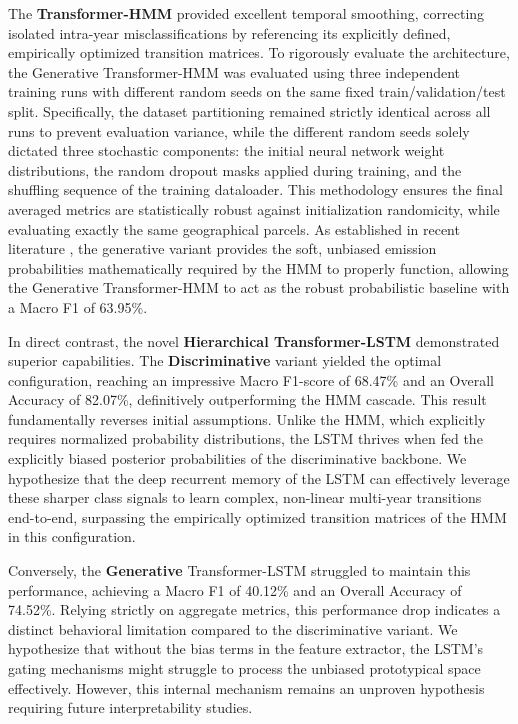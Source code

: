 The \textbf{Transformer-HMM} provided excellent temporal smoothing,
correcting isolated intra-year misclassifications by referencing its explicitly defined, empirically optimized transition matrices. 
To rigorously evaluate the architecture, the Generative Transformer-HMM was evaluated
using three independent training runs with different random seeds on the same fixed train/validation/test split. 
Specifically, the dataset partitioning remained strictly identical across all runs to prevent evaluation variance,
while the different random seeds solely dictated three stochastic components: the initial neural network weight distributions,
the random dropout masks applied during training, and the shuffling sequence of the training dataloader.
This methodology ensures the final averaged metrics are statistically robust against initialization
randomicity, while evaluating exactly the same geographical parcels.
As established in recent literature \cite{perantoni_bayesian_2024}, the generative variant provides the soft,
unbiased emission probabilities mathematically required by the HMM to properly function,
allowing the Generative Transformer-HMM to act as the robust probabilistic baseline with a Macro F1 of 63.95\%.

In direct contrast, the novel \textbf{Hierarchical Transformer-LSTM} demonstrated superior capabilities.
The \textbf{Discriminative} variant yielded the optimal configuration, reaching an impressive Macro F1-score
of 68.47\% and an Overall Accuracy of 82.07\%, definitively outperforming the HMM cascade. 
This result fundamentally reverses initial assumptions.
Unlike the HMM, which explicitly requires normalized probability distributions,
the LSTM thrives when fed the explicitly biased posterior probabilities of the discriminative backbone.
We hypothesize that the deep recurrent memory of the LSTM can effectively leverage these sharper class signals to learn complex,
non-linear multi-year transitions end-to-end, surpassing the empirically optimized transition matrices of the HMM in this configuration.

Conversely, the \textbf{Generative} Transformer-LSTM struggled to maintain this performance,
achieving a Macro F1 of 40.12\% and an Overall Accuracy of 74.52\%.
Relying strictly on aggregate metrics, this performance drop indicates a
distinct behavioral limitation compared to the discriminative variant.
We hypothesize that without the bias terms in the feature extractor,
the LSTM's gating mechanisms might struggle to process the unbiased prototypical space effectively.
However, this internal mechanism remains an unproven hypothesis requiring future interpretability studies.


